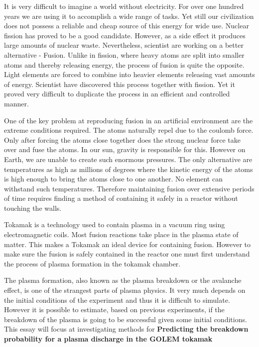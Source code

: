 It is very difficult to imagine a world without electricity. For over one hundred years we are using it to accomplish a wide range of tasks. Yet still our civilization does not possess a reliable and cheap source of this energy for wide use. Nuclear fission has proved to be a good candidate. However, as a side effect it produces large amounts of nuclear waste. Nevertheless, scientist are working on a better alternative - Fusion. Unlike in fission, where heavy atoms are split into smaller atoms and thereby releasing energy, the process of fusion is quite the opposite. Light elements are forced to combine into heavier elements releasing vast amounts of energy. Scientist have discovered this process together with fission. Yet it proved very difficult to duplicate the process in an efficient and controlled manner. 

One of the key problem at reproducing fusion in an artificial environment are the extreme conditions required. The atoms naturally repel due to the coulomb force. Only after forcing the atoms close together does the strong nuclear force take over and fuse the atoms. In our sun, gravity is responsible for this. However on Earth, we are unable to create such enormous pressures. The only alternative are temperatures as high as millions of degrees where the kinetic energy of the atoms is high enough to bring the atoms close to one another. No element can withstand such temperatures. Therefore maintaining fusion over extensive periods of time requires finding a method of containing it safely in a reactor without touching the walls. 

Tokamak is a technology used to contain plasma in a vacuum ring using electromagnetic coils. Most fusion reactions take place in the plasma state of matter. This makes a Tokamak an ideal device for containing fusion. However to make sure the fusion is safely contained in the reactor one must first understand the process of plasma formation in the tokamak chamber.

The plasma formation, also known as the plasma breakdown or the avalanche effect, is one of the strangest parts of plasma physics. It very much depends on the initial conditions of the experiment and thus it is difficult to simulate. However it is possible to estimate, based on previous experiments, if the breakdown of the plasma is going to be successful given some initial conditions. This essay will focus at investigating methods for \textbf{ Predicting the breakdown probability for a plasma discharge in the GOLEM tokamak} 